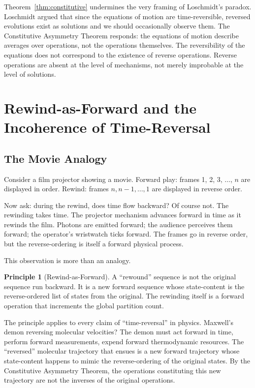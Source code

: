 \documentclass[twocolumn,10pt,a4paper]{article}
\theoremstyle{definition}
\newtheorem{principle}[theorem]{Principle}
\theoremstyle{remark}
\begin{document}
Theorem~\ref{thm:constitutive} undermines the very framing of Loschmidt's paradox. Loschmidt argued that since the equations of motion are time-reversible, reversed evolutions exist as solutions and we should occasionally observe them. The Constitutive Asymmetry Theorem responds: the equations of motion describe averages over operations, not the operations themselves. The reversibility of the equations does not correspond to the existence of reverse operations. Reverse operations are absent at the level of mechanisms, not merely improbable at the level of solutions.

\section{Rewind-as-Forward and the Incoherence of Time-Reversal}
\label{sec:rewind}

\subsection{The Movie Analogy}

Consider a film projector showing a movie. Forward play: frames 1, 2, 3, $\ldots$, $n$ are displayed in order. Rewind: frames $n, n-1, \ldots, 1$ are displayed in reverse order.

Now ask: during the rewind, does time flow backward? Of course not. The rewinding takes time. The projector mechanism advances forward in time as it rewinds the film. Photons are emitted forward; the audience perceives them forward; the operator's wristwatch ticks forward. The frames go in reverse order, but the reverse-ordering is itself a forward physical process.

This observation is more than an analogy.

\begin{principle}[Rewind-as-Forward]
\label{princ:rewind}
A ``rewound'' sequence is not the original sequence run backward. It is a new forward sequence whose state-content is the reverse-ordered list of states from the original. The rewinding itself is a forward operation that increments the global partition count.
\end{principle}

The principle applies to every claim of ``time-reversal'' in physics. Maxwell's demon reversing molecular velocities? The demon must act forward in time, perform forward measurements, expend forward thermodynamic resources. The ``reversed'' molecular trajectory that ensues is a new forward trajectory whose state-content happens to mimic the reverse-ordering of the original states. By the Constitutive Asymmetry Theorem, the operations constituting this new trajectory are not the inverses of the original operations.
\end{document}
